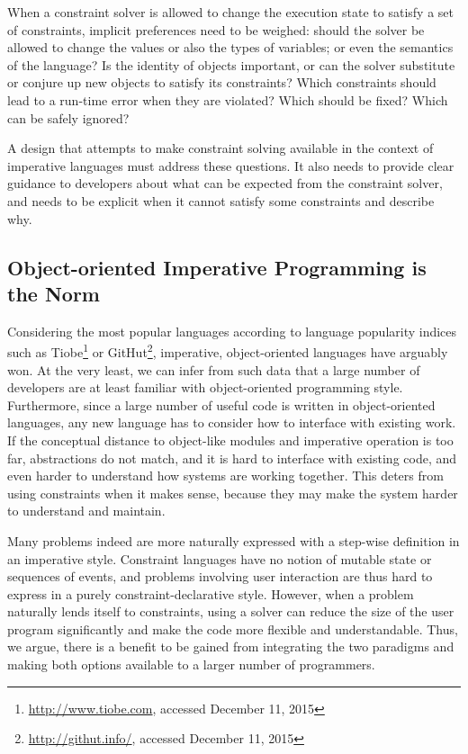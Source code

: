 When a constraint solver is allowed to change the execution state to satisfy a
set of constraints, implicit preferences need to be weighed: should the solver
be allowed to change the values or also the types of variables; or even the
semantics of the language? Is the identity of objects important, or can the solver
substitute or conjure up new objects to satisfy its constraints? Which
constraints should lead to a run-time error when they are violated? Which should
be fixed? Which can be safely ignored?

A design that attempts to make constraint solving available in the context of
imperative languages must address these questions. It also needs to provide
clear guidance to developers about what can be expected from the constraint
solver, and needs to be explicit when it cannot satisfy some constraints and
describe why.

\subsection*{Object-oriented Imperative Programming is the Norm}
\label{sec:be-backw-comp}

Considering the most popular languages according to language popularity indices
such as Tiobe\footnote{\url{http://www.tiobe.com}, accessed December 11, 2015}
or GitHut\footnote{\url{http://githut.info/}, accessed December 11, 2015}, imperative, object-oriented
languages have arguably won. At the very least, we can infer from such data that
a large number of developers are at least familiar with object-oriented
programming style. Furthermore, since a large number of useful code is written
in object-oriented languages, any new language has to consider how to interface
with existing work. If the conceptual distance to object-like modules and
imperative operation is too far, abstractions do not match, and it is hard to
interface with existing code, and even harder to understand how systems are
working together. This deters from using constraints when it makes sense,
because they may make the system harder to understand and maintain.

Many problems indeed are more naturally expressed with a step-wise
definition in an imperative style. Constraint languages have no notion
of mutable state or sequences of events, and problems involving user
interaction are thus hard to express in a purely
constraint-declarative style. However, when a problem naturally lends
itself to constraints, using a solver can reduce the size of the user
program significantly and make the code more flexible and
understandable. Thus, we argue, there is a benefit to be gained from
integrating the two paradigms and making both options available to a
larger number of programmers.

